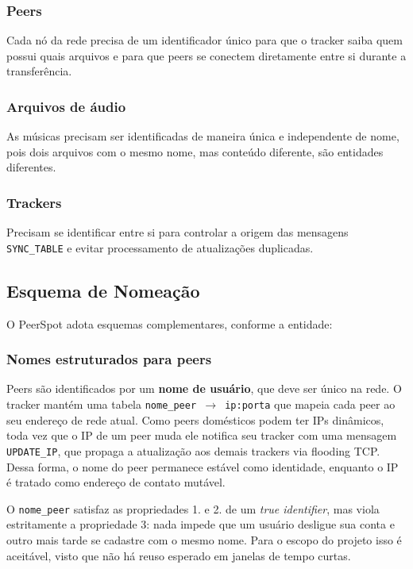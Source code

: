 \documentclass[12pt, a4paper]{article}
\begin{document}
\subsubsection*{Peers}
Cada nó da rede precisa de um identificador único para que o tracker saiba quem possui quais arquivos e para que peers se conectem diretamente entre si durante a transferência.
    
\subsubsection*{Arquivos de áudio}
As músicas precisam ser identificadas de maneira única e independente de nome, pois dois arquivos com o mesmo nome, mas conteúdo diferente, são entidades diferentes.
    
\subsubsection*{Trackers}
Precisam se identificar entre si para controlar a origem das mensagens \texttt{SYNC\_TABLE} e evitar processamento de atualizações duplicadas.


\subsection{Esquema de Nomeação}\label{sec:esquema-nome}

O PeerSpot adota esquemas complementares, conforme a entidade:

\subsubsection*{Nomes estruturados para peers}

Peers são identificados por um \textbf{nome de usuário}, que deve ser único na rede. O tracker mantém uma tabela \texttt{nome\_peer $\rightarrow$ ip:porta} que mapeia cada peer ao seu endereço de rede atual. Como peers domésticos podem ter IPs dinâmicos, toda vez que o IP de um peer muda ele notifica seu tracker com uma mensagem \texttt{UPDATE\_IP}, que propaga a atualização aos demais trackers via flooding TCP. Dessa forma, o nome do peer permanece estável como identidade, enquanto o IP é tratado como endereço de contato mutável.

O \texttt{nome\_peer} satisfaz as propriedades 1. e 2. de um \textit{true identifier}, mas viola estritamente a propriedade 3: nada impede que um usuário desligue sua conta e outro mais tarde se cadastre com o mesmo nome. Para o escopo do projeto isso é aceitável, visto que não há reuso esperado em janelas de tempo curtas.
\end{document}
